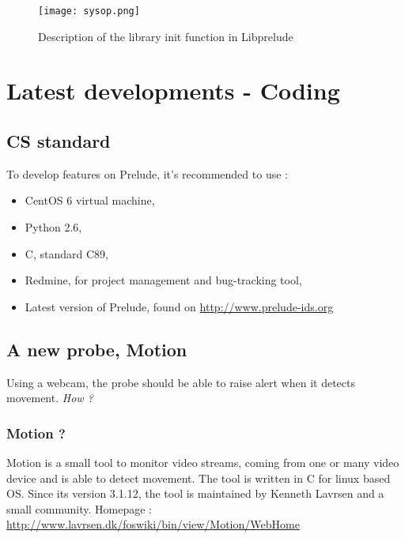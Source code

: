 \documentclass{koala-en}
\begin{document}
\begin{figure}[!ht]
  \center
  \texttt{[image: sysop.png]}
  \caption{Description of the library init function in Libprelude}
\end{figure}

\thispagestyle{fancy}
\newpage

\chapter{Latest developments - Coding}
\section{CS standard}
To develop features on Prelude, it's recommended to use :
\begin{itemize}
  \item CentOS 6 virtual machine,
  \item Python 2.6,
  \item C, standard C89,
  \item Redmine, for project management and bug-tracking tool,
  \item Latest version of Prelude, found on \url{http://www.prelude-ids.org}
\end{itemize}

\section{A new probe, Motion}
Using a webcam, the probe should be able to raise alert when it detects movement. \emph{How ?}
\subsection{Motion ?}
Motion is a small tool to monitor video streams, coming from one or many video device and is able to detect movement.
\newline
\newline
The tool is written in C for linux based OS.
\newline
\newline
Since its version 3.1.12, the tool is maintained by Kenneth Lavrsen and a small community.
\newline
Homepage : \url{http://www.lavrsen.dk/foswiki/bin/view/Motion/WebHome}
\end{document}
